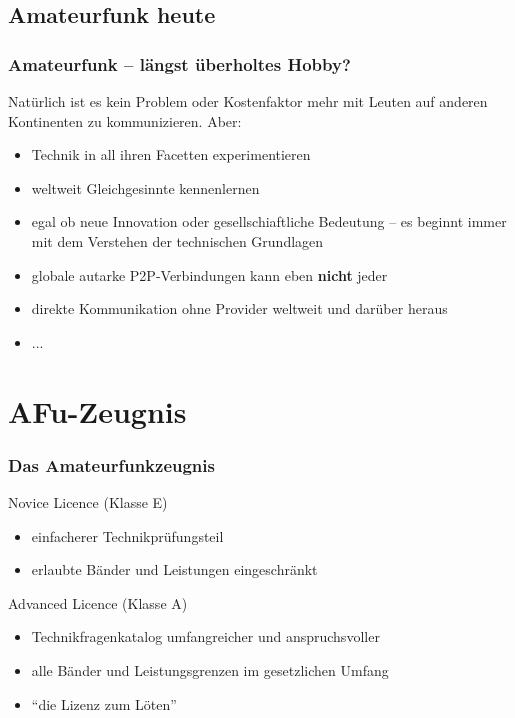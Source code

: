 \subsection{Amateurfunk heute}

\begin{frame}
    \frametitle{Amateurfunk -- längst überholtes Hobby?}

    Natürlich ist es kein Problem oder Kostenfaktor mehr mit Leuten auf
    anderen Kontinenten zu kommunizieren. Aber:

    \begin{itemize}
        \item Technik in all ihren Facetten experimentieren
        \item weltweit Gleichgesinnte kennenlernen
        \item egal ob neue Innovation oder gesellschiaftliche Bedeutung -- es beginnt
              immer mit dem Verstehen der technischen Grundlagen
        \item globale autarke P2P-Verbindungen kann eben \textbf{nicht} jeder
        \item direkte Kommunikation ohne Provider weltweit und darüber heraus
        \item ...
    \end{itemize}

\end{frame}

\section{AFu-Zeugnis}

\begin{frame}
    \frametitle{Das Amateurfunkzeugnis}

    Novice Licence (Klasse E)
    
    \begin{itemize}
        \item einfacherer Technikprüfungsteil
        \item erlaubte Bänder und Leistungen eingeschränkt
    \end{itemize}

    Advanced Licence (Klasse A)
    
    \begin{itemize}
        \item Technikfragenkatalog umfangreicher und anspruchsvoller
        \item alle Bänder und Leistungsgrenzen im gesetzlichen Umfang
        \pause
        \item ``die Lizenz zum Löten''
    \end{itemize}

\end{frame}

